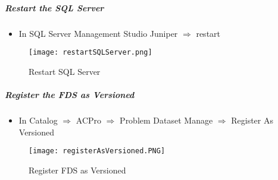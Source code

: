   
\subparagraph{Restart the SQL Server}

\begin{itemize}
\item In SQL Server Management Studio { \rtArrow}  Juniper $\Rightarrow$ restart
\end{itemize}

\begin{figure}[h!]
\centering
    \texttt{[image: restartSQLServer.png]}
\vspace*{-3mm}\caption{Restart SQL Server}

\end{figure}
\clearpage


\subparagraph{Register the FDS as Versioned}
\begin{itemize}
\item In Catalog $\Rightarrow$  ACPro $\Rightarrow$ Problem Dataset  { \rtArrow} Manage $\Rightarrow$ Register As Versioned
\end{itemize}
\begin{figure}[h!]
\centering
    \texttt{[image: registerAsVersioned.PNG]}
\vspace*{-3mm}\caption{Register FDS as Versioned}

\end{figure}
\clearpage
 
    

